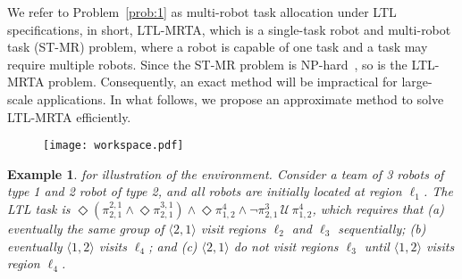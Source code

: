 \documentclass[journal]{IEEEtran}
\newtheorem{exmp}{Example}
\newcommand{\ag}[2]{\langle#1,#2\rangle}
\renewcommand{\ap}[3]{\mathcal{\pi}_{{#1},{#2}}^{#3}}
\begin{document}
We refer to Problem~\ref{prob:1} as multi-robot task allocation under LTL specifications, in short, LTL-MRTA, which is a single-task robot and multi-robot task (ST-MR) problem, where a robot is capable of one task and a task may require multiple robots. Since the ST-MR problem is NP-hard~\cite{korsah2013comprehensive,nunes2017taxonomy}, so is the LTL-MRTA problem. Consequently, an exact method will be impractical for large-scale applications. In what follows, we propose an approximate method to solve LTL-MRTA efficiently.
\begin{figure}[t]
    \centering
    \texttt{[image: workspace.pdf]}
    \caption{}\label{fig:workspace}
 \end{figure}
\begin{exmp}\label{exp:1}
   for illustration of the environment.  Consider a team of 3 robots of type 1 and 2 robot of type 2, and all robots are initially located at region $\ell_1$. The LTL task is $\Diamond (\ap{2}{1}{2,1} \wedge  \Diamond \ap{2}{1}{3,1})  \wedge \Diamond \ap{1}{2}{4} \wedge \neg \ap{2}{1}{3} \,\mathcal{U}\, \ap{1}{2}{4}$, which requires that (a) eventually the same group of $\langle2,1\rangle$ visit regions  $\ell_2$ and $\ell_3$ sequentially; (b) eventually $\langle1,2\rangle$ visits $\ell_4$; and (c) $\ag{2}{1}$ do not visit regions $\ell_3$ until $\ag{1}{2}$ visits region $\ell_4$.
\end{exmp}
\end{document}
